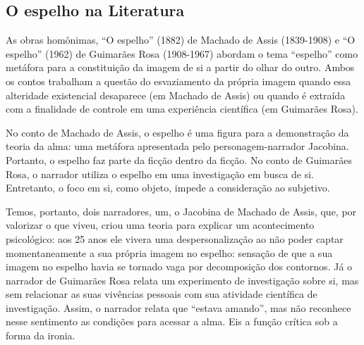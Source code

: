 \begin{multicols}{2}


\section*{O espelho na Literatura}
\par{}As obras homônimas,\allowbreak{} “O espelho” (\allowbreak{}1882)\allowbreak{} de Machado de Assis (\allowbreak{}1839-\allowbreak{}1908)\allowbreak{} e “O espelho” (\allowbreak{}1962)\allowbreak{} de Guimarães Rosa (\allowbreak{}1908-\allowbreak{}1967)\allowbreak{} abordam o tema “espelho” como metáfora para a constituição da imagem de si a partir do olhar do outro.\allowbreak{} Ambos os contos trabalham a questão do esvaziamento da própria imagem quando essa alteridade existencial desaparece (\allowbreak{}em Machado de Assis)\allowbreak{} ou quando é extraída com a finalidade de controle em uma experiência científica (\allowbreak{}em Guimarães Rosa)\allowbreak{}.\allowbreak{}\par{}No conto de Machado de Assis,\allowbreak{} o espelho é uma figura para a demonstração da teoria da alma:\allowbreak{} uma metáfora apresentada pelo personagem-\allowbreak{}narrador Jacobina.\allowbreak{} Portanto,\allowbreak{} o espelho faz parte da ficção dentro da ficção.\allowbreak{} No conto de Guimarães Rosa,\allowbreak{} o narrador utiliza o espelho em uma investigação em busca de si.\allowbreak{} Entretanto,\allowbreak{} o foco em si,\allowbreak{} como objeto,\allowbreak{} impede a consideração ao subjetivo.\allowbreak{}\par{}Temos,\allowbreak{} portanto,\allowbreak{} dois narradores,\allowbreak{} um,\allowbreak{} o Jacobina de Machado de Assis,\allowbreak{} que,\allowbreak{} por valorizar o que viveu,\allowbreak{} criou uma teoria para explicar um acontecimento psicológico:\allowbreak{} aos 25 anos ele vivera uma despersonalização ao não poder captar momentaneamente a sua própria imagem no espelho:\allowbreak{} sensação de que a sua imagem no espelho havia se tornado vaga por decomposição dos contornos.\allowbreak{} Já o narrador de Guimarães Rosa relata um experimento de investigação sobre si,\allowbreak{} mas sem relacionar as suas vivências pessoais com sua atividade científica de investigação.\allowbreak{} Assim,\allowbreak{} o narrador relata que “estava amando”,\allowbreak{} mas não reconhece nesse sentimento as condições para acessar a alma.\allowbreak{} Eis a função crítica sob a forma da ironia.\allowbreak{}

\end{multicols}
